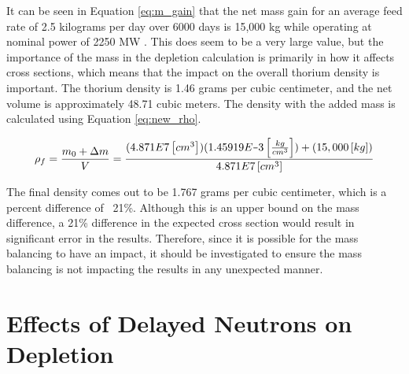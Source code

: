 It can be seen in Equation \eqref{eq:m_gain} that the net mass gain for an average feed rate of 2.5 kilograms per day over 6000 days is 15,000 kg \cite{rykhlevskii_fuel_2020, betzler_molten_2017} while operating at nominal power of 2250 MW \cite{robertson_conceptual_1971}. This does seem to be a very large value, but the importance of the mass in the depletion calculation is primarily in how it affects cross sections, which means that the impact on the overall thorium density is important. The thorium density is 1.46 grams per cubic centimeter, and the net volume is approximately 48.71 cubic meters. The density with the added mass is calculated using Equation \eqref{eq:new_rho}.

\begin{equation} \hfill
\rho_f = \frac{m_0 + \Delta m}{V} = \frac{(4.871E7 \left[cm^3 \right])(1.45919E\minus3 \left[ \frac{kg}{cm^3} \right]) + (15,000 \left[ kg \right])}{4.871E7 \left[ cm^3 \right]} 
\hfill\label{eq:new_rho} \end{equation}

The final density comes out to be 1.767 grams per cubic centimeter, which is a percent difference of ~21\%. Although this is an upper bound on the mass difference, a 21\% difference in the expected cross section would result in significant error in the results. Therefore, since it is possible for the mass balancing to have an impact, it should be investigated to ensure the mass balancing is not impacting the results in any unexpected manner.









\section{Effects of Delayed Neutrons on Depletion}

